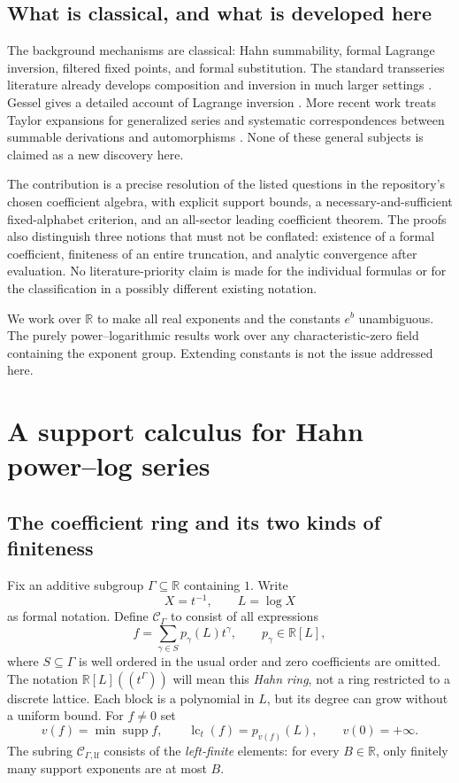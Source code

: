 \documentclass[11pt,a4paper]{article}
\theoremstyle{definition}
\theoremstyle{remark}
\newcommand{\R}{\mathbb R}
\newcommand{\C}{\mathcal C_\Gamma}
\newcommand{\Clf}{\mathcal C_{\Gamma,\mathrm{lf}}}
\newcommand{\supp}{\operatorname{supp}}
\newcommand{\lc}{\operatorname{lc}_t}
\begin{document}
\subsection{What is classical, and what is developed here}
The background mechanisms are classical: Hahn summability, formal Lagrange
inversion, filtered fixed points, and formal substitution. The standard
transseries literature already develops composition and inversion in much
larger settings \cite{vdH,EdgarComposition,EdgarGrids}. Gessel gives a detailed
account of Lagrange inversion \cite{Gessel}. More recent work treats Taylor
expansions for generalized series and systematic correspondences between
summable derivations and automorphisms
\cite{BagayokoMantova,BKKPS,BagayokoLie}. None of these general subjects is
claimed as a new discovery here.

The contribution is a precise resolution of the listed questions in the
repository's chosen coefficient algebra, with explicit support bounds, a
necessary-and-sufficient fixed-alphabet criterion, and an all-sector leading
coefficient theorem. The proofs also distinguish three notions that must not
be conflated: existence of a formal coefficient, finiteness of an entire
truncation, and analytic convergence after evaluation. No literature-priority
claim is made for the individual formulas or for the classification in a
possibly different existing notation.

We work over $\R$ to make all real exponents and the constants $e^{b}$
unambiguous. The purely power--logarithmic results work over any
characteristic-zero field containing the exponent group. Extending constants
is not the issue addressed here.

\section{A support calculus for Hahn power--log series}
\label{sec:hahn}

\subsection{The coefficient ring and its two kinds of finiteness}
Fix an additive subgroup $\Gamma\subseteq\R$ containing $1$. Write
\[
 X=t^{-1},\qquad L=\log X
\]
as formal notation. Define $\C$ to consist of all expressions
\begin{equation}\label{eq:C}
 f=\sum_{\gamma\in S}p_\gamma(L)t^\gamma,
 \qquad p_\gamma\in\R[L],
\end{equation}
where $S\subseteq\Gamma$ is well ordered in the usual order and zero
coefficients are omitted. The notation $\R[L]((t^\Gamma))$ will mean this
\emph{Hahn ring}, not a ring restricted to a discrete lattice. Each block is a
polynomial in $L$, but its degree can grow without a uniform bound.
For $f\ne0$ set
\[
 v(f)=\min\supp f,\qquad \lc(f)=p_{v(f)}(L),\qquad v(0)=+\infty.
\]
The subring $\Clf$ consists of the \emph{left-finite} elements: for every
$B\in\R$, only finitely many support exponents are at most $B$.
\end{document}
